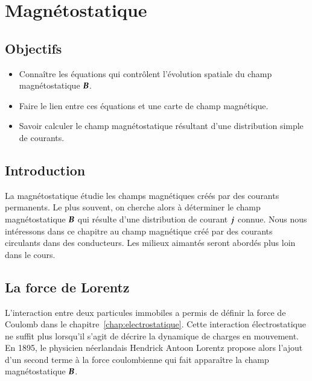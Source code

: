 \chapter{Magnétostatique}
\label{chap:magnetostatique}
\section*{Objectifs}%
\label{sec:objectifs}
\begin{itemize}
	\item Connaître les équations qui contrôlent l'évolution spatiale 
	  du champ magnétostatique $\vecb$.
	\item Faire le lien entre ces équations et une carte de champ 
	  magnétique.
	\item Savoir calculer le champ magnétostatique résultant d'une 
	  distribution simple de courants.
\end{itemize}
\newpage
\section*{Introduction}
La magnétostatique étudie les champs magnétiques créés par des courants permanents.
Le plus souvent, on cherche alors à déterminer le champ magnétostatique $\vecb$
qui résulte d'une distribution de courant $\vecj$ connue. Nous nous intéressons
dans ce chapitre au champ magnétique créé par des courants circulants 
dans des conducteurs. Les milieux aimantés seront abordés plus loin dans le cours.

\section{La force de Lorentz}%
L'interaction entre deux particules immobiles a permis de définir la force de 
Coulomb dans le chapitre~\ref{chap:electrostatique}. Cette interaction 
électrostatique ne suffit plus lorsqu'il s'agit de décrire la dynamique de 
charges en mouvement. En 1895, le physicien néerlandais Hendrick Antoon Lorentz
propose alors l'ajout d'un second terme à la force coulombienne qui fait apparaître
la champ magnétostatique $\vecb$. 

